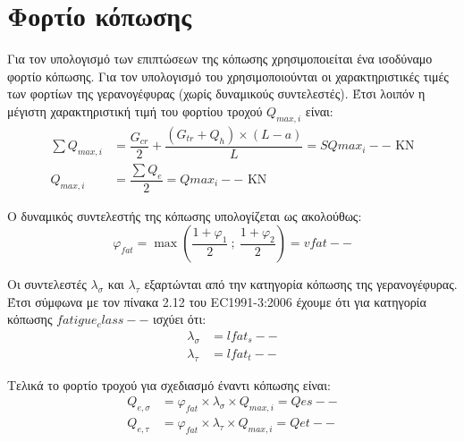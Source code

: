 \section{Φορτίο κόπωσης}
Για τον υπολογισμό των επιπτώσεων της κόπωσης χρησιμοποιείται ένα ισοδύναμο φορτίο κόπωσης. Για τον υπολογισμό του χρησιμοποιούνται οι χαρακτηριστικές τιμές των φορτίων της γερανογέφυρας (χωρίς δυναμικούς συντελεστές). Έτσι λοιπόν η μέγιστη χαρακτηριστική τιμή του φορτίου τροχού  $Q_{max,i}$ είναι:
\begin{align*}
\sum{Q_{max,i}}     &= \dfrac{G_{cr}}{2} + \dfrac{(G_{tr} + Q_h) \times (L - a)}{L}   = SQmax_i-- \text{ KN} \\
Q_{max,i}           &= \dfrac{\displaystyle\sum{Q_e}}{2}                               = Qmax_i--  \text{ KN}
\end{align*}

Ο δυναμικός συντελεστής της κόπωσης υπολογίζεται ως ακολούθως:
\begin{equation*}
φ_{fat} = \max \left( \dfrac{1+φ_1}{2}\ ; \ \dfrac{1+φ_2}{2} \right) =vfat--
\end{equation*}

Οι συντελεστές $λ_σ$ και $λ_τ$ εξαρτώνται από την κατηγορία κόπωσης της γερανογέφυρας. Έτσι σύμφωνα με τον πίνακα 2.12 του EC1991-3:2006 έχουμε ότι για κατηγορία κόπωσης $fatigue_class--$ ισχύει ότι:
\begin{align*}
λ_σ	&= lfat_s--\\
λ_τ	&= lfat_t--
\end{align*}

Τελικά το φορτίο τροχού για σχεδιασμό έναντι κόπωσης είναι:
\begin{align*}
Q_{e,σ} &= φ_{fat} \times λ_σ \times Q_{max,i} = Qes--\\
Q_{e,τ}	 &= φ_{fat} \times λ_τ \times Q_{max,i} = Qet--
\end{align*}
